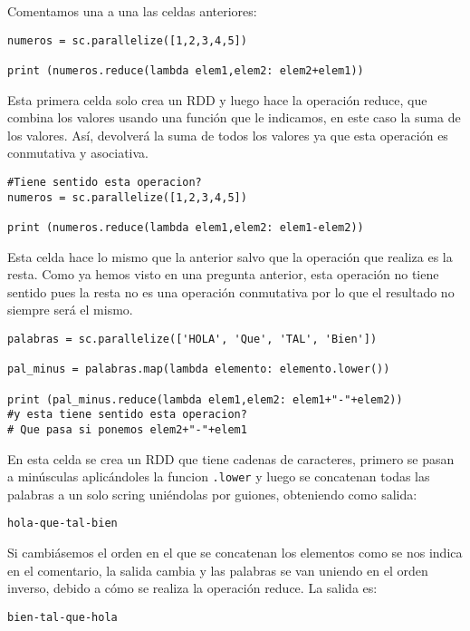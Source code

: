 \documentclass[11pt]{article}
\def\inline{\lstinline[basicstyle=\ttfamily,keywordstyle={}]}
\begin{document}
Comentamos una a una las celdas anteriores:

\begin{verbatim}
numeros = sc.parallelize([1,2,3,4,5])

print (numeros.reduce(lambda elem1,elem2: elem2+elem1))
\end{verbatim}

Esta primera celda solo crea un RDD y luego hace la operación reduce, que combina los valores usando una función que le indicamos, en este caso la suma de los valores. Así, devolverá la suma de todos los valores ya que esta operación es conmutativa y asociativa.

\begin{verbatim}
#Tiene sentido esta operacion?
numeros = sc.parallelize([1,2,3,4,5])

print (numeros.reduce(lambda elem1,elem2: elem1-elem2))
\end{verbatim}

Esta celda hace lo mismo que la anterior salvo que la operación que realiza es la resta. Como ya hemos visto en una pregunta anterior, esta operación no tiene sentido pues la resta no es una operación conmutativa por lo que el resultado no siempre será el mismo.

\begin{verbatim}
palabras = sc.parallelize(['HOLA', 'Que', 'TAL', 'Bien'])

pal_minus = palabras.map(lambda elemento: elemento.lower())

print (pal_minus.reduce(lambda elem1,elem2: elem1+"-"+elem2))
#y esta tiene sentido esta operacion?
# Que pasa si ponemos elem2+"-"+elem1
\end{verbatim}

En esta celda se crea un RDD que tiene cadenas de caracteres, primero se pasan a minúsculas aplicándoles la funcion \inline{.lower} y luego se concatenan todas las palabras a un solo scring uniéndolas por guiones, obteniendo como salida:

\begin{verbatim}
hola-que-tal-bien
\end{verbatim}

Si cambiásemos el orden en el que se concatenan los elementos como se nos indica en el comentario, la salida cambia y las palabras se van uniendo en el orden inverso, debido a cómo se realiza la operación reduce. La salida es:

\begin{verbatim}
bien-tal-que-hola
\end{verbatim}
\end{document}
